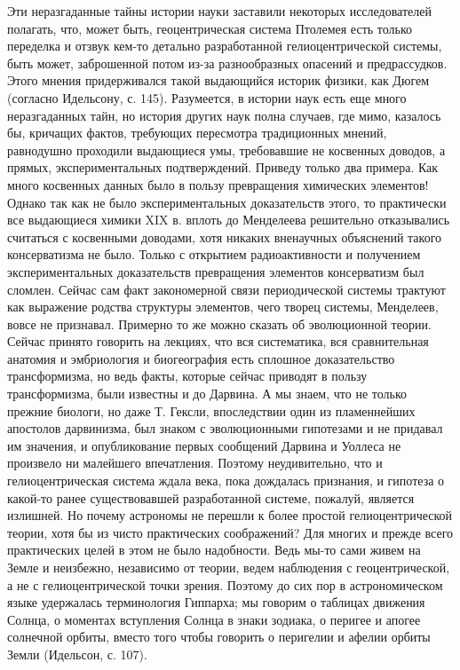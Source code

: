 Эти   неразгаданные   тайны    истории   науки   заставили   некоторых
исследователей  полагать,  что,  может быть,  геоцентрическая  система
Птолемея есть только переделка  и отзвук кем-то детально разработанной
гелиоцентрической  системы,   быть  может,  заброшенной   потом  из-за
разнообразных  опасений и  предрассудков.  Этого мнения  придерживался
такой  выдающийся  историк  физики,  как  Дюгем  (согласно  Идельсону,
с.  145). Разумеется,  в  истории наук  есть  еще много  неразгаданных
тайн, но  история других  наук полна случаев,  где мимо,  казалось бы,
кричащих фактов, требующих  пересмотра традиционных мнений, равнодушно
проходили  выдающиеся   умы,  требовавшие  не  косвенных   доводов,  а
прямых, экспериментальных  подтверждений. Приведу только  два примера.
Как  много  косвенных  данных  было в  пользу  превращения  химических
элементов!  Однако так  как  не  было экспериментальных  доказательств
этого,  то  практически  все  выдающиеся   химики  XIX  в.  вплоть  до
Менделеева  решительно отказывались  считаться с  косвенными доводами,
хотя  никаких  вненаучных  объяснений такого  консерватизма  не  было.
Только  с  открытием  радиоактивности и  получением  экспериментальных
доказательств превращения  элементов консерватизм был  сломлен. Сейчас
сам  факт  закономерной  связи   периодической  системы  трактуют  как
выражение родства структуры элементов, чего творец системы, Менделеев,
вовсе  не признавал.  Примерно  то же  можно  сказать об  эволюционной
теории. Сейчас принято  говорить на лекциях, что  вся систематика, вся
сравнительная  анатомия и  эмбриология  и  биогеография есть  сплошное
доказательство трансформизма, но ведь факты, которые сейчас приводят в
пользу  трансформизма, были  известны и  до Дарвина.  А мы  знаем, что
не  только  прежние биологи,  но  даже  Т. Гексли,  впоследствии  один
из  пламеннейших  апостолов  дарвинизма, был  знаком  с  эволюционными
гипотезами и не придавал им значения, и опубликование первых сообщений
Дарвина  и  Уоллеса не  произвело  ни  малейшего впечатления.  Поэтому
неудивительно,  что  и  гелиоцентрическая  система  ждала  века,  пока
дождалась  признания,  и  гипотеза  о  какой-то  ранее  существовавшей
разработанной системе, пожалуй, является излишней. Но почему астрономы
не перешли к более простой  гелиоцентрической теории, хотя бы из чисто
практических соображений? Для многих и прежде всего практических целей
в этом не было надобности. Ведь мы-то сами живем на Земле и неизбежно,
независимо  от теории,  ведем  наблюдения с  геоцентрической,  а не  с
гелиоцентрической точки  зрения. Поэтому до сих  пор в астрономическом
языке удержалась терминология Гиппарха; мы говорим о таблицах движения
Солнца,  о моментах  вступления Солнца  в знаки  зодиака, о  перигее и
апогее  солнечной орбиты,  вместо того  чтобы говорить  о перигелии  и
афелии орбиты Земли (Идельсон, с. 107).

